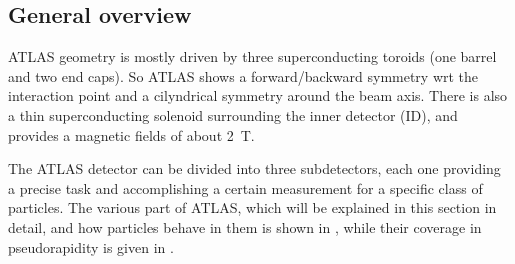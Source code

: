 


\subsection{General overview}
ATLAS geometry is mostly driven by three superconducting toroids (one barrel and two end caps). So ATLAS shows a forward/backward symmetry wrt the interaction point and a cilyndrical symmetry around the beam axis. There is also a thin superconducting solenoid surrounding the inner detector (ID), and provides a magnetic fields of about \SI{2}{\tesla}.

The ATLAS detector can be divided into three subdetectors, each one providing a precise task and accomplishing a certain measurement for a specific class of particles. The various part of ATLAS, which will be explained in this section in detail, and how particles behave in them is shown in \Fig{\ref{fig:behaviour}}, while their coverage in pseudorapidity is given in \Tab{\ref{tab:eta}}.
